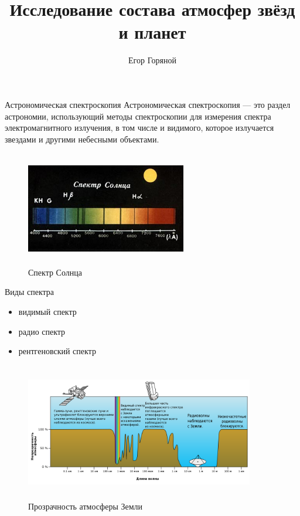 \documentclass[
]{beamer}
\title{Исследование состава атмосфер звёзд и планет}
\author[]{Егор Горяной}
\begin{document}
	
	\begin{frame}[plain]
		\maketitle
	\end{frame}
	\begin{frame}{Астрономическая спектроскопия}
		Астрономическая спектроскопия — это раздел астрономии, использующий методы спектроскопии для измерения спектра электромагнитного излучения, в том числе и видимого, которое излучается звездами и другими небесными объектами.
		\begin{figure}[H]
			\centering
			\includegraphics[width=7cm, height=5cm]{Спектр_солнца.jpg}
			\caption{Спектр Солнца}
		\end{figure}
	\end{frame}

	\begin{frame}{Виды спектра}
		\begin{itemize}
			\item видимый спектр
			\item радио спектр
			\item рентгеновский спектр
		\end{itemize}
		\begin{figure}[H]
			\centering
			\includegraphics[width=10cm, height=6cm]{прозрачность.png}
			\caption{Прозрачность атмосферы Земли}
		\end{figure}
	\end{frame}
	
\end{document}

